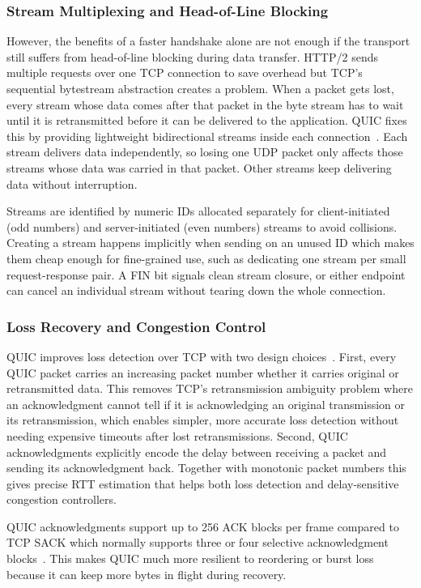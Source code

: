 \subsubsection{Stream Multiplexing and Head-of-Line Blocking}
However, the benefits of a faster handshake alone are not enough if the transport still suffers from head-of-line blocking during data transfer. HTTP/2 sends multiple requests over one TCP connection to save overhead but TCP's sequential bytestream abstraction creates a problem. When a packet gets lost, every stream whose data comes after that packet in the byte stream has to wait until it is retransmitted before it can be delivered to the application. QUIC fixes this by providing lightweight bidirectional streams inside each connection~\citep{LangleyAdam2017TQTP}. Each stream delivers data independently, so losing one UDP packet only affects those streams whose data was carried in that packet. Other streams keep delivering data without interruption.
\par
Streams are identified by numeric IDs allocated separately for client-initiated (odd numbers) and server-initiated (even numbers) streams to avoid collisions. Creating a stream happens implicitly when sending on an unused ID which makes them cheap enough for fine-grained use, such as dedicating one stream per small request-response pair. A FIN bit signals clean stream closure, or either endpoint can cancel an individual stream without tearing down the whole connection.
\subsubsection{Loss Recovery and Congestion Control}

QUIC improves loss detection over TCP with two design choices~\citep{LangleyAdam2017TQTP}. First, every QUIC packet carries an increasing packet number whether it carries original or retransmitted data. This removes TCP's retransmission ambiguity problem where an acknowledgment cannot tell if it is acknowledging an original transmission or its retransmission, which enables simpler, more accurate loss detection without needing expensive timeouts after lost retransmissions. Second, QUIC acknowledgments explicitly encode the delay between receiving a packet and sending its acknowledgment back. Together with monotonic packet numbers this gives precise RTT estimation that helps both loss detection and delay-sensitive congestion controllers.

QUIC acknowledgments support up to 256 ACK blocks per frame compared to TCP SACK which normally supports three or four selective acknowledgment blocks~\citep{LangleyAdam2017TQTP}. This makes QUIC much more resilient to reordering or burst loss because it can keep more bytes in flight during recovery.

